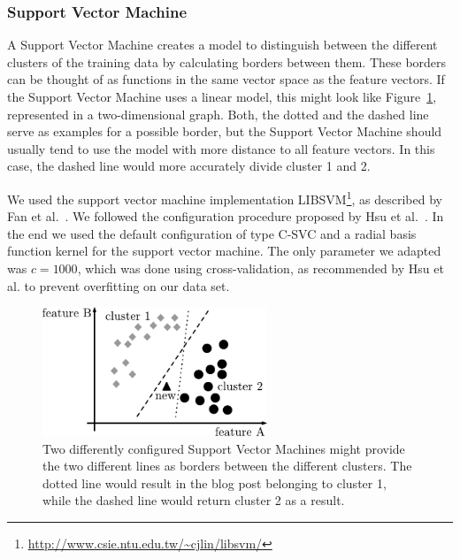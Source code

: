 \subsubsection{Support Vector Machine}
\label{sec:support_vector_machine}


A Support Vector Machine creates a model to distinguish between the different clusters of the training data by calculating borders between them.
These borders can be thought of as functions in the same vector space as the feature vectors.
If the Support Vector Machine uses a linear model, this might look like Figure~\ref{fig:svm}, represented in a two-dimensional graph.
Both, the dotted and the dashed line serve as examples for a possible border, but the Support Vector Machine should usually tend to use the model with more distance to all feature vectors.
In this case, the dashed line would more accurately divide cluster 1 and 2.


We used the support vector machine implementation LIBSVM\footnote{\url{http://www.csie.ntu.edu.tw/~cjlin/libsvm/}}, as described by Fan et al.~\cite{fan2005working}.
We followed the configuration procedure proposed by Hsu et al.~\cite{hsu2003practical}.
In the end we used the default configuration of type C-SVC and a radial basis function kernel for the support vector machine.
The only parameter we adapted was $c=1000$, which was done using cross-validation, as recommended by Hsu et al. to prevent overfitting on our data set.


\begin{figure}[h]
    \centering
    \includegraphics[width=0.6\textwidth]{images/svm.pdf}
    \caption{Two differently configured Support Vector Machines might provide the two different lines as borders between the different clusters. The dotted line would result in the blog post belonging to cluster 1, while the dashed line would return cluster 2 as a result.}
    \label{fig:svm}
\end{figure}
